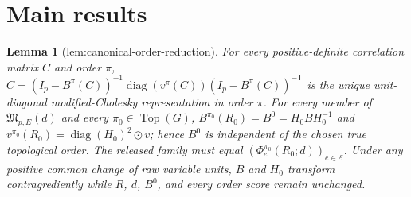\documentclass{article}
\newtheorem{lemma}{Lemma}
\begin{document}
\section{Main results}

\begin{lemma}[lem:canonical-order-reduction]\label{lem:canonical-order-reduction}
For every positive-definite correlation matrix \(C\) and order \(\pi\), \(C=(I_p-B^{\pi}(C))^{-1}\operatorname{diag}(v^{\pi}(C))(I_p-B^{\pi}(C))^{-\mathsf T}\) is the unique unit-diagonal modified-Cholesky representation in order \(\pi\). For every member of \(\mathfrak M_{p,E}(d)\) and every \(\pi_0\in\operatorname{Top}(G)\), \(B^{\pi_0}(R_0)=B^0=H_0BH_0^{-1}\) and \(v^{\pi_0}(R_0)=\operatorname{diag}(H_0)^2\odot v\); hence \(B^0\) is independent of the chosen true topological order. The released family must equal \((\Phi_e^{\pi_0}(R_0;d))_{e\in\mathcal E}\). Under any positive common change of raw variable units, \(B\) and \(H_0\) transform contragrediently while \(R\), \(d\), \(B^0\), and every order score remain unchanged.
\end{lemma}
\end{document}
